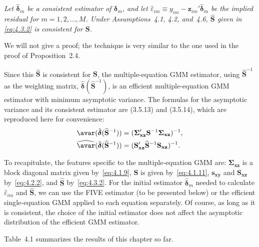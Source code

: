 \begin{proposition}
\label{prop:4.2}
\textit{Let\/ $\hat{\boldsymbol{\delta}}_m$ be a consistent estimator of\/
$\boldsymbol{\delta}_m$, and let\/
$\hat{\varepsilon}_{im} \equiv y_{im} - \mathbf{z}_{im}' \hat{\boldsymbol{\delta}}_m$ be
the implied residual for $m = 1, 2, \ldots, M$.
Under Assumptions~4.1, 4.2, and~4.6, $\widehat{\mathbf{S}}$ given in
\eqref{eq:4.3.2} is consistent for\/ $\mathbf{S}$.}
\end{proposition}

We will not give a proof; the technique is very similar to the one used in the proof
of Proposition~2.4.

Since this $\widehat{\mathbf{S}}$ is consistent for $\mathbf{S}$, the multiple-equation
GMM estimator, using $\widehat{\mathbf{S}}^{-1}$ as the weighting matrix,
$\hat{\boldsymbol{\delta}}(\widehat{\mathbf{S}}^{-1})$, is an efficient multiple-equation
GMM estimator with minimum asymptotic variance. The formulas for the asymptotic
variance and its consistent estimator are (3.5.13) and (3.5.14), which are reproduced
here for convenience:
\begin{align}
\avar(\hat{\boldsymbol{\delta}}(\widehat{\mathbf{S}}^{-1}))
&= (\boldsymbol{\Sigma}_{\mathbf{xz}}' \mathbf{S}^{-1}
\boldsymbol{\Sigma}_{\mathbf{xz}})^{-1},
\label{eq:4.3.3} \\
\widehat{\avar}(\hat{\boldsymbol{\delta}}(\widehat{\mathbf{S}}^{-1}))
&= (\mathbf{S}_{\mathbf{xz}}' \widehat{\mathbf{S}}^{-1}
\mathbf{S}_{\mathbf{xz}})^{-1}.
\label{eq:4.3.4}
\end{align}

To recapitulate, the features specific to the multiple-equation GMM are:
$\boldsymbol{\Sigma}_{\mathbf{xz}}$ is a block diagonal matrix given by~\eqref{eq:4.1.9},
$\mathbf{S}$ is given by~\eqref{eq:4.1.11},
$\mathbf{s}_{\mathbf{xy}}$ and $\mathbf{S}_{\mathbf{xz}}$ by~\eqref{eq:4.2.2},
and $\widehat{\mathbf{S}}$ by~\eqref{eq:4.3.2}.
For the initial estimator $\hat{\boldsymbol{\delta}}_m$ needed to calculate
$\hat{\varepsilon}_{im}$ and $\widehat{\mathbf{S}}$, we can use the FIVE estimator
(to be presented below) or the efficient single-equation GMM applied to each equation
separately. Of course, as long as it is consistent, the choice of the initial
estimator does not affect the asymptotic distribution of the efficient GMM estimator.

Table~4.1 summarizes the results of this chapter so far.

